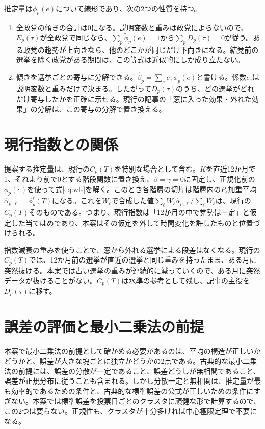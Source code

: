 \documentclass[a4paper,11pt]{ltjsarticle}
\begin{document}
推定量は$\tilde\phi_p(e)$について線形であり、次の2つの性質を持つ。

\begin{enumerate}
  \item 全政党の傾きの合計は0になる。説明変数と重みは政党によらないので、$E_p(\tau)$が全政党で同じなら、$\sum_p\tilde\phi_p(e)=1$から$\sum_p D_p(\tau)=0$が従う。ある政党の趨勢が上向きなら、他のどこかが同じだけ下向きになる。結党前の選挙を除く政党がある期間は、この等式は近似的にしか成り立たない。
  \item 傾きを選挙ごとの寄与に分解できる。$\hat\beta_p=\sum_{e}c_e\,\tilde\phi_p(e)$と書ける。係数$c_e$は説明変数と重みだけで決まる。したがって$D_p(\tau)$のうち、どの選挙がどれだけ寄与したかを正確に示せる。現行の記事の「窓に入った効果・外れた効果」の分解は、この寄与の分解で置き換える。
\end{enumerate}

\section{現行指数との関係}
\label{sec:relation}

提案する推定量は、現行の$C_p(T)$を特別な場合として含む。$K$を直近12か月で1、それより前で0とする階段関数に置き換え、$\beta=\gamma=0$に固定し、正規化前の$\phi_p(e)$を使って式\eqref{eq:wls}を解く。このとき各階層の切片は階層内の$P_e$加重平均$\hat\alpha_{p,\ell}=\phi_p^\ell(T)$になる。これを$W_\ell$で合成した値$\sum_\ell W_\ell\hat\alpha_{p,\ell}/\sum_\ell W_\ell$は、現行の$C_p(T)$そのものである。つまり、現行指数は「12か月の中で党勢は一定」と仮定した当てはめであり、本案はその仮定を外して時間変化を許したものと位置づけられる。

指数減衰の重みを使うことで、窓から外れる選挙による段差はなくなる。現行の$C_p(T)$では、12か月前の選挙が直近の選挙と同じ重みを持ったまま、ある月に突然抜ける。本案では古い選挙の重みが連続的に減っていくので、ある月に突然データが抜けることがない。$C_p(T)$は水準の参考として残し、記事の主役を$D_p(\tau)$に移す。

\section{誤差の評価と最小二乗法の前提}
\label{sec:inference}

本案で最小二乗法の前提として確かめる必要があるのは、平均の構造が正しいかどうかと、誤差が大きな塊ごとに独立かどうかの2点である。古典的な最小二乗法の前提には、誤差の分散が一定であること、誤差どうしが無相関であること、誤差が正規分布に従うことも含まれる。しかし分散一定と無相関は、推定量が最も効率的であるための条件と、古典的な標準誤差の公式が正しいための条件にすぎない。本案では標準誤差を投票日ごとのクラスタに頑健な形で計算するので、この2つは要らない。正規性も、クラスタが十分多ければ中心極限定理で不要になる。
\end{document}
